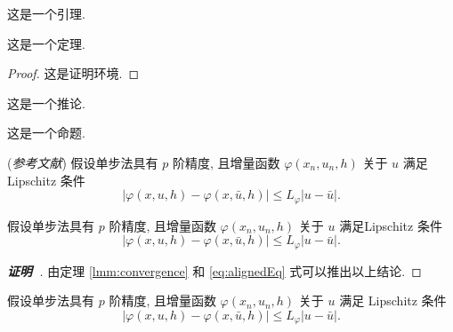 \begin{lemma}[Lemma]\label{lmm:foo}
这是一个引理.
\end{lemma}

\begin{theorem}[Theorem]\label{thm:foo}
这是一个定理.
\end{theorem}
\begin{proof}
这是证明环境.
\end{proof}

\begin{corollary}\label{cor:foo}
这是一个推论.
\end{corollary}

\begin{proposition}[Proposition]
这是一个命题.
\end{proposition}

\begin{lemma}\label{lmm:convergence} {\upshape (\textit{参考文献}\cite{LiLiu1997})}
假设单步法具有 $p$ 阶精度, 且增量函数 $\varphi(x_{n}, u_{n}, h)$ 关于 $u$ 满足 \textup{Lipschitz} 条件
\begin{equation}\label{eq:conver1}
|\varphi(x, u, h)-\varphi(x, \bar{u}, h)| \leqslant L_{\varphi}|u-\bar{u}|.
\end{equation}
\end{lemma}

\begin{theorem}\label{thm:convergence}
假设单步法具有 $p$ 阶精度, 且增量函数 $\varphi(x_{n}, u_{n}, h)$ 关于 $u$ 满足\textup{Lipschitz} 条件
\begin{equation}\label{eq:conver2}
|\varphi(x, u, h)-\varphi(x, \bar{u}, h)| \leqslant L_{\varphi}|u-\bar{u}|.
\end{equation}
\end{theorem}
\begin{proof}[\normalfont\bfseries 证明~\nopunct]
由定理 \ref{lmm:convergence} 和 \eqref{eq:alignedEq} 式可以推出以上结论.
\end{proof}

\begin{corollary}\label{col:convergence}
假设单步法具有 $p$ 阶精度, 且增量函数 $\varphi(x_{n}, u_{n}, h)$ 关于 $u$ 满足 \textup{Lipschitz} 条件
\begin{equation}\label{eq:conver3}
|\varphi(x, u, h)-\varphi(x, \bar{u}, h)| \leqslant L_{\varphi}|u-\bar{u}|.
\end{equation}
\end{corollary}

